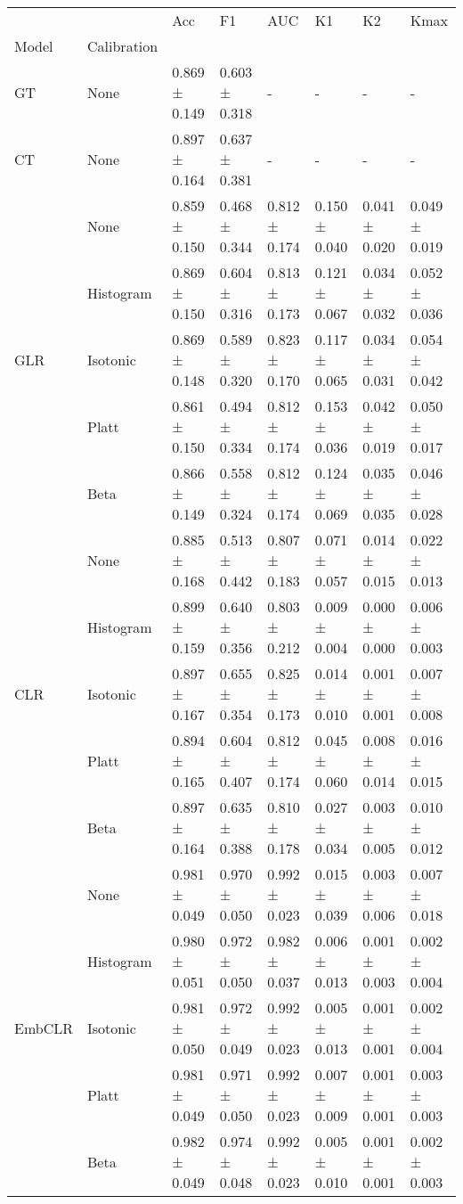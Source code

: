 \begin{tabular}{llllllll}
\toprule
 &  & Acc & F1 & AUC & K1 & K2 & Kmax \\
Model & Calibration &  &  &  &  &  &  \\
\midrule
GT & None & 0.869 ± 0.149 & 0.603 ± 0.318 & - & - & - & - \\
\cline{1-8}
CT & None & 0.897 ± 0.164 & 0.637 ± 0.381 & - & - & - & - \\
\cline{1-8}
\multirow[t]{5}{*}{GLR} & None & 0.859 ± 0.150 & 0.468 ± 0.344 & 0.812 ± 0.174 & 0.150 ± 0.040 & 0.041 ± 0.020 & 0.049 ± 0.019 \\
 & Histogram & 0.869 ± 0.150 & 0.604 ± 0.316 & 0.813 ± 0.173 & 0.121 ± 0.067 & 0.034 ± 0.032 & 0.052 ± 0.036 \\
 & Isotonic & 0.869 ± 0.148 & 0.589 ± 0.320 & 0.823 ± 0.170 & 0.117 ± 0.065 & 0.034 ± 0.031 & 0.054 ± 0.042 \\
 & Platt & 0.861 ± 0.150 & 0.494 ± 0.334 & 0.812 ± 0.174 & 0.153 ± 0.036 & 0.042 ± 0.019 & 0.050 ± 0.017 \\
 & Beta & 0.866 ± 0.149 & 0.558 ± 0.324 & 0.812 ± 0.174 & 0.124 ± 0.069 & 0.035 ± 0.035 & 0.046 ± 0.028 \\
\cline{1-8}
\multirow[t]{5}{*}{CLR} & None & 0.885 ± 0.168 & 0.513 ± 0.442 & 0.807 ± 0.183 & 0.071 ± 0.057 & 0.014 ± 0.015 & 0.022 ± 0.013 \\
 & Histogram & 0.899 ± 0.159 & 0.640 ± 0.356 & 0.803 ± 0.212 & 0.009 ± 0.004 & 0.000 ± 0.000 & 0.006 ± 0.003 \\
 & Isotonic & 0.897 ± 0.167 & 0.655 ± 0.354 & 0.825 ± 0.173 & 0.014 ± 0.010 & 0.001 ± 0.001 & 0.007 ± 0.008 \\
 & Platt & 0.894 ± 0.165 & 0.604 ± 0.407 & 0.812 ± 0.174 & 0.045 ± 0.060 & 0.008 ± 0.014 & 0.016 ± 0.015 \\
 & Beta & 0.897 ± 0.164 & 0.635 ± 0.388 & 0.810 ± 0.178 & 0.027 ± 0.034 & 0.003 ± 0.005 & 0.010 ± 0.012 \\
\cline{1-8}
\multirow[t]{5}{*}{EmbCLR} & None & 0.981 ± 0.049 & 0.970 ± 0.050 & 0.992 ± 0.023 & 0.015 ± 0.039 & 0.003 ± 0.006 & 0.007 ± 0.018 \\
 & Histogram & 0.980 ± 0.051 & 0.972 ± 0.050 & 0.982 ± 0.037 & 0.006 ± 0.013 & 0.001 ± 0.003 & 0.002 ± 0.004 \\
 & Isotonic & 0.981 ± 0.050 & 0.972 ± 0.049 & 0.992 ± 0.023 & 0.005 ± 0.013 & 0.001 ± 0.001 & 0.002 ± 0.004 \\
 & Platt & 0.981 ± 0.049 & 0.971 ± 0.050 & 0.992 ± 0.023 & 0.007 ± 0.009 & 0.001 ± 0.001 & 0.003 ± 0.003 \\
 & Beta & 0.982 ± 0.049 & 0.974 ± 0.048 & 0.992 ± 0.023 & 0.005 ± 0.010 & 0.001 ± 0.001 & 0.002 ± 0.003 \\
\cline{1-8}
\bottomrule
\end{tabular}
